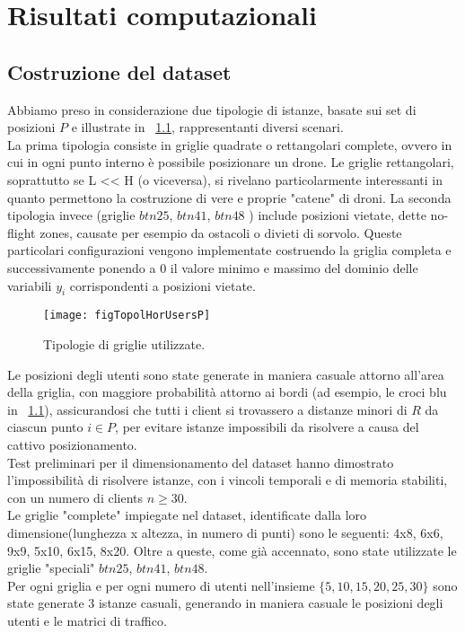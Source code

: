  \chapter{Risultati computazionali} \label{chap:risultati}

\ifpdf
    \graphicspath{{Chapter7/Figs/Raster/}{Chapter7/Figs/PDF/}{Chapter7/Figs/}}
\else
    \graphicspath{{Chapter7/Figs/Vector/}{Chapter7/Figs/}}
\fi

\section{Costruzione del dataset}
Abbiamo preso in considerazione due tipologie di istanze, basate sui set di posizioni $P$ e illustrate in \figurename\ \ref{figP}, rappresentanti diversi scenari. \\
La prima tipologia consiste in griglie quadrate o rettangolari complete, ovvero in cui in ogni punto interno è possibile posizionare un drone. Le griglie rettangolari, soprattutto se L << H (o viceversa), si rivelano particolarmente interessanti in quanto permettono la costruzione di vere e proprie "catene" di droni. La seconda tipologia invece (griglie $btn25$, $btn41$, $btn48$ \cite{degioPal2013}) include posizioni vietate, dette no-flight zones, causate per esempio da ostacoli o divieti di sorvolo. Queste particolari configurazioni vengono implementate costruendo la griglia completa e successivamente ponendo a 0 il valore minimo e massimo del dominio delle variabili $y_i$ corrispondenti a posizioni vietate.\\
%
\begin{figure}
	\begin{center}
		\texttt{[image: figTopolHorUsersP]}
	\end{center}
	\caption{Tipologie di griglie utilizzate.} \label{figP}
\end{figure}
%
Le posizioni degli utenti sono state generate in maniera casuale attorno all'area della griglia, con maggiore probabilità attorno ai bordi (ad esempio, le croci blu in \figurename\ \ref{figP}), assicurandosi che tutti i client si trovassero a distanze minori di $R$ da ciascun punto $i \in P$, per evitare istanze impossibili da risolvere a causa del cattivo posizionamento. \\
Test preliminari per il dimensionamento del dataset hanno dimostrato l'impossibilità di risolvere istanze, con i vincoli temporali e di memoria stabiliti, con un numero di clients $n \geq 30$. \\
Le griglie "complete" impiegate nel dataset, identificate dalla loro dimensione(lunghezza x altezza, in numero di punti) sono le seguenti: 4x8, 6x6, 9x9, 5x10, 6x15, 8x20. Oltre a queste, come già accennato, sono state utilizzate le griglie "speciali" $btn25$, $btn41$, $btn48$.\\
Per ogni griglia e per ogni numero di utenti nell'insieme $\{5, 10, 15, 20, 25, 30\}$ sono state generate 3 istanze casuali, generando in maniera casuale le posizioni degli utenti e le matrici di traffico. \\

